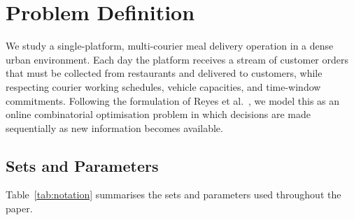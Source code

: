 
\section{Problem Definition}\label{sec:problem}

We study a single-platform, multi-courier meal delivery operation
in a dense urban environment.
Each day the platform receives a stream of customer orders that
must be collected from restaurants and delivered to customers,
while respecting courier working schedules, vehicle capacities,
and time-window commitments.
Following the formulation of Reyes et al.~\cite{reyes2018mdrp},
we model this as an online combinatorial optimisation problem
in which decisions are made sequentially as new information
becomes available.

\subsection{Sets and Parameters}\label{subsec:notation}

Table~\ref{tab:notation} summarises the sets and parameters used
throughout the paper.

